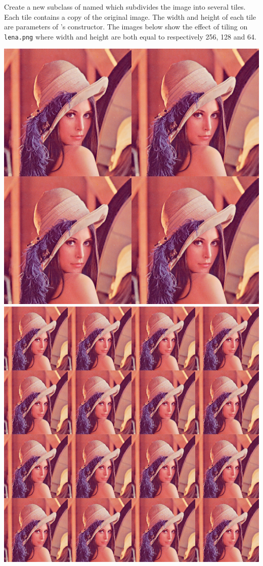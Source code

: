 \documentclass{book}
\begin{document}
\begin{exercise}
Create a new subclass of  named  which subdivides the image into several tiles. Each tile contains a copy of the original image. The width and height of each tile are parameters of 's constructor. The images below show the effect of tiling on \texttt{lena.png} where width and height are both equal to respectively 256, 128 and 64.
\begin{center}
\includegraphics[scale=0.2]{lena-tiled-256.png}
\includegraphics[scale=0.2]{lena-tiled-128.png}

\end{center}
\end{exercise}
\end{document}
